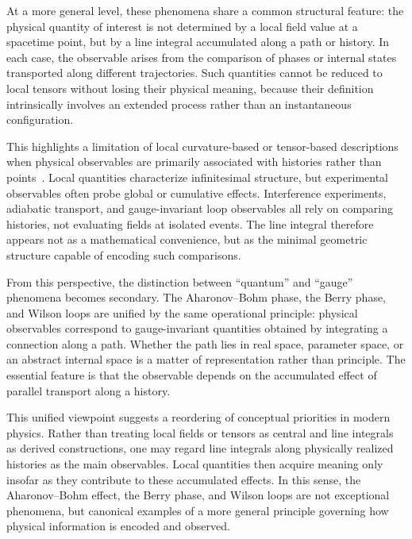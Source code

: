 \documentclass[%
 reprint,
 amsmath,amssymb,
 aps,
 prb,
]{revtex4-2}
\numberwithin{equation}{section}
\begin{document}
At a more general level, these phenomena share a common structural feature: the physical quantity of interest is not determined by a local field value at a spacetime point, but by a line integral accumulated along a path or history. In each case, the observable arises from the comparison of phases or internal states transported along different trajectories. Such quantities cannot be reduced to local tensors without losing their physical meaning, because their definition intrinsically involves an extended process rather than an instantaneous configuration.

This highlights a limitation of local curvature-based or tensor-based descriptions when physical observables are primarily associated with histories rather than points~\cite{Nakahara2003}. Local quantities characterize infinitesimal structure, but experimental observables often probe global or cumulative effects. Interference experiments, adiabatic transport, and gauge-invariant loop observables all rely on comparing histories, not evaluating fields at isolated events. The line integral therefore appears not as a mathematical convenience, but as the minimal geometric structure capable of encoding such comparisons.

From this perspective, the distinction between ``quantum'' and ``gauge'' phenomena becomes secondary. The Aharonov--Bohm phase, the Berry phase, and Wilson loops are unified by the same operational principle: physical observables correspond to gauge-invariant quantities obtained by integrating a connection along a path. Whether the path lies in real space, parameter space, or an abstract internal space is a matter of representation rather than principle. The essential feature is that the observable depends on the accumulated effect of parallel transport along a history.

This unified viewpoint suggests a reordering of conceptual priorities in modern physics. Rather than treating local fields or tensors as central and line integrals as derived constructions, one may regard line integrals along physically realized histories as the main observables. Local quantities then acquire meaning only insofar as they contribute to these accumulated effects. In this sense, the Aharonov--Bohm effect, the Berry phase, and Wilson loops are not exceptional phenomena, but canonical examples of a more general principle governing how physical information is encoded and observed.


\end{document}

